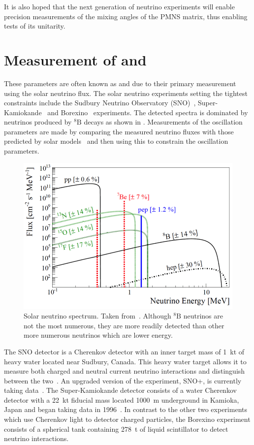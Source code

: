 It is also hoped that the next generation of neutrino experiments will enable precision measurements of the mixing angles of the PMNS matrix, thus enabling tests of its unitarity.

\section{Measurement of  and }
\label{sec:theory:currentState:solar}

These parameters are often known as  and  due to their primary measurement using the solar neutrino flux.
The solar neutrino experiments setting the tightest constraints include the Sudbury Neutrino Observatory (SNO)~\cite{snoCombined}, Super-Kamiokande~\cite{superKReview} and Borexino~\cite{borexino} experiments.
The detected \nue spectra is dominated by neutrinos produced by $^{8}\text{B}$ decays as shown in .
Measurements of the oscillation parameters are made by comparing the measured neutrino fluxes with those predicted by solar models~\cite{solarModel} and then using this to constrain the oscillation parameters.

\begin{figure}[h]
  \centering
  \includegraphics[width=.7\linewidth]{files/figures/theory/solarNeutrinoSpectrum}
  \caption{Solar neutrino spectrum. Taken from~\cite{solarNuFluxes}. Although $^{8}\text{B}$ neutrinos are not the most numerous, they are more readily detected than other more numerous neutrinos which are lower energy.}
  \label{fig:solarNuFluxes}
\end{figure}

The SNO detector is a Cherenkov detector with an inner target mass of 1~kt of heavy water located near Sudbury, Canada.
This heavy water target allows it to measure both charged and neutral current neutrino interactions and distinguish between the two~\cite{snoCombined}. An upgraded version of the experiment, SNO+, is currently taking data~\cite{snoPlus}. 
The Super-Kamiokande detector consists of a water Cherenkov detector with a 22~kt fiducial mass located 1000~m underground in Kamioka, Japan and began taking data in 1996~\cite{superKReview}.
In contrast to the other two experiments which use Cherenkov light to detector charged particles, the Borexino experiment consists of a spherical tank containing 278~t of liquid scintillator to detect neutrino interactions.

